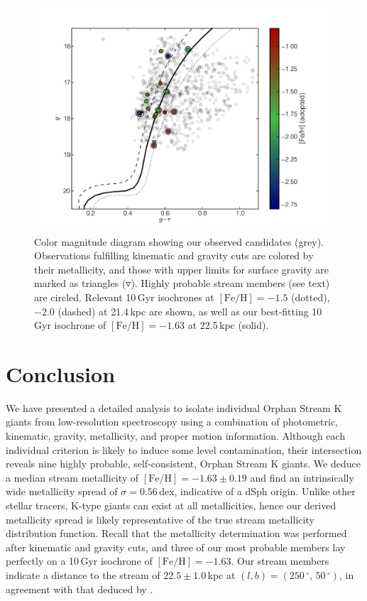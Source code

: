 \documentclass{emulateapj}
\begin{document}
\begin{figure}[h]
	\includegraphics[width=\columnwidth]{./figures/cmd.pdf}
	\caption{Color magnitude diagram showing our observed candidates (grey). Observations fulfilling kinematic and gravity cuts are colored by their metallicity, and those with upper limits for surface gravity are marked as triangles ($\triangledown$). Highly probable stream members (see text) are circled. Relevant 10\,Gyr \citet{Girardi;et-al_2008} isochrones at $[\mbox{Fe/H}] = -1.5$ (dotted), $-2.0$ (dashed) at 21.4\,kpc \citep{Newberg;et-al_2010} are shown, as well as our best-fitting 10\,Gyr isochrone of $[\mbox{Fe/H}] = -1.63$ at 22.5\,kpc (solid).}
	\label{fig:cmd}
\end{figure}


\section{Conclusion}
\label{sec:conclusions}

We have presented a detailed analysis to isolate individual Orphan Stream K giants from low-resolution spectroscopy using a combination of photometric, kinematic, gravity, metallicity, and proper motion information. Although each individual criterion is likely to induce some level contamination, their intersection reveals nine highly probable, self-consistent, Orphan Stream K giants.  We deduce a median stream metallicity of $[\mbox{Fe/H}] = -1.63 \pm 0.19$ and find an intrinsically wide metallicity spread of $\sigma = 0.56$\,dex, indicative of a dSph origin. Unlike other stellar tracers, K-type giants can exist at all metallicities, hence our derived metallicity spread is likely representative of the true stream metallicity distribution function. Recall that the metallicity determination was performed after kinematic and gravity cuts, and three of our most probable members lay perfectly on a 10\,Gyr isochrone of $[\mbox{Fe/H}] = -1.63$. Our stream members indicate a distance to the stream of $22.5 \pm 1.0$\,kpc at $(l, b) = (250\,^\circ,\,50\,^\circ)$, in agreement with that deduced by \citet{Newberg;et-al_2010}.
\end{document}
